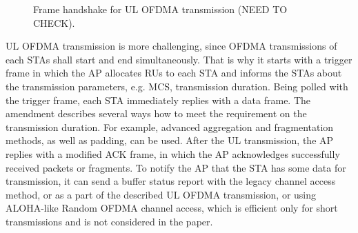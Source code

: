 \begin{figure}[t]
{}
	\caption{\label{fig:transmission} Frame handshake for UL OFDMA transmission (NEED TO CHECK).}
	\vspace{-0.5em}
\end{figure}

UL OFDMA transmission is more challenging, since
OFDMA transmissions of each STAs shall start and end
simultaneously. That is why it starts with a trigger frame in
which the AP allocates RUs to each STA and informs the
STAs about the transmission parameters, e.g. MCS, transmission
duration. Being polled with the trigger frame, each
STA immediately replies with a data frame. The amendment
describes several ways how to meet the requirement on the
transmission duration. For example, advanced aggregation and
fragmentation methods, as well as padding, can be used. After
the UL transmission, the AP replies with a modified ACK
frame, in which the AP acknowledges successfully received
packets or fragments. To notify the AP that the STA has
some data for transmission, it can send a buffer status report
with the legacy channel access method, or as a part of the
described UL OFDMA transmission, or using ALOHA-like
Random OFDMA channel access, which is efficient only for
short transmissions and is not considered in the paper.

